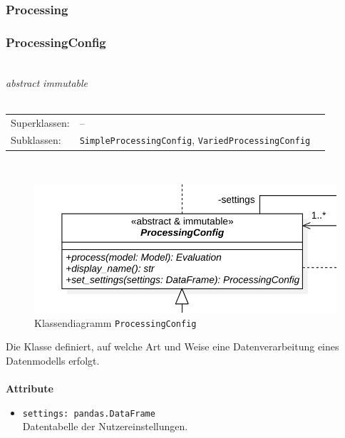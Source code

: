 \documentclass{article}
\begin{document}
\newpage
\subsubsection{Processing}

\subsubsection*{\large{\textbf{ProcessingConfig}\label{cls:ProcessingConfig}}}\\
\textit{\flqq{}abstract\frqq} \textit{\flqq{}immutable\frqq}\normalsize\\\\
\begin{tabular}{lll}
 Superklassen: & --\\
 Subklassen: & \texttt{SimpleProcessingConfig}, \texttt{VariedProcessingConfig}
\end{tabular}\\
\begin{figure}[H]%
    \centering
    \includegraphics[width=13cm]{entwurf/Entwurf_dokument/img/cls/ProcessingConfig.png}
    \caption{Klassendiagramm \texttt{ProcessingConfig}}
\end{figure}

Die Klasse definiert, auf welche Art und Weise eine Datenverarbeitung eines Datenmodells erfolgt.
\\\\

\textbf{{Attribute}}
\begin{itemize}\setlength\itemsep{3em}
\item \texttt{settings: pandas.DataFrame}\\ 
Datentabelle der Nutzereinstellungen.
\\\\
\end{itemize}
\end{document}

